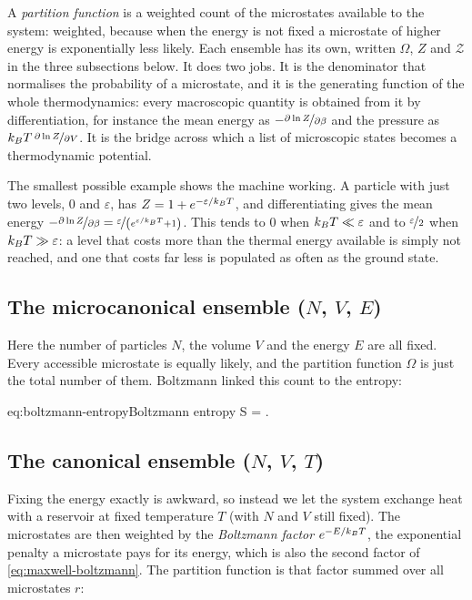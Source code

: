     A \emph{partition function} is a weighted count of the microstates available to the system: weighted, because when the energy is not fixed a microstate of higher energy is exponentially less likely. Each ensemble has its own, written $\Omega$, $Z$ and $\mathcal{Z}$ in the three subsections below. It does two jobs. It is the denominator that normalises the probability of a microstate, and it is the generating function of the whole thermodynamics: every macroscopic quantity is obtained from it by differentiation, for instance the mean energy as $-\nicefrac{\partial \ln Z}{\partial\beta}$ and the pressure as $k_{B} T\,\nicefrac{\partial \ln Z}{\partial V}$. It is the bridge across which a list of microscopic states becomes a thermodynamic potential.

    The smallest possible example shows the machine working. A particle with just two levels, $0$ and $\varepsilon$, has $Z = 1 + e^{-\varepsilon/k_{B} T}$, and differentiating gives the mean energy $-\nicefrac{\partial \ln Z}{\partial\beta} = \nicefrac{\varepsilon}{\left(e^{\varepsilon/k_{B} T}+1\right)}$. This tends to $0$ when $k_{B} T \ll \varepsilon$ and to $\nicefrac{\varepsilon}{2}$ when $k_{B} T \gg \varepsilon$: a level that costs more than the thermal energy available is simply not reached, and one that costs far less is populated as often as the ground state.

    \subsection{The microcanonical ensemble ($N$, $V$, $E$)}

        Here the number of particles $N$, the volume $V$ and the energy $E$ are all fixed. Every accessible microstate is equally likely, and the partition function $\Omega$ is just the total number of them. Boltzmann linked this count to the entropy:

        \begin{keyeq}{eq:boltzmann-entropy}{Boltzmann entropy}
            S = \kB \ln\Omega .
        \end{keyeq}

    \subsection{The canonical ensemble ($N$, $V$, $T$)}

        Fixing the energy exactly is awkward, so instead we let the system exchange heat with a reservoir at fixed temperature $T$ (with $N$ and $V$ still fixed). The microstates are then weighted by the \emph{Boltzmann factor} $e^{-E/k_{B} T}$, the exponential penalty a microstate pays for its energy, which is also the second factor of \cref{eq:maxwell-boltzmann}. The partition function is that factor summed over all microstates $r$:

